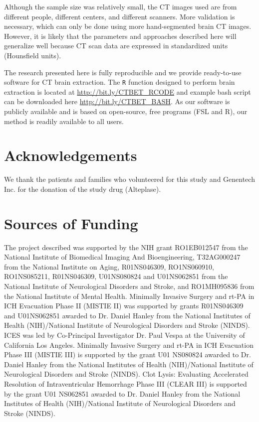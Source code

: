 \documentclass{elsarticle}\usepackage[]{graphicx}\usepackage[]{color}
\begin{document}
Although the sample size was relatively small, the CT images used are from different people, different centers, and different scanners.  More validation is necessary, which can only be done using more hand-segmented brain CT images. However, it is likely that the parameters and approaches described here will generalize well because CT scan data are expressed in standardized units (Hounsfield units).

The research presented here is fully reproducible and we provide ready-to-use software for CT brain extraction. The \texttt{R} function designed to perform brain extraction is located at
\url{http://bit.ly/CTBET_RCODE} and example bash script can be downloaded here \url{http://bit.ly/CTBET_BASH}.  As our software is publicly available and is based on open-source, free programs (FSL and R), our method is readily available to all users.

\section*{Acknowledgements}
We thank the patients and families who volunteered for this study and Genentech Inc. for the donation of the study drug (Alteplase).

\section*{Sources of Funding}
The project described was supported by the NIH grant RO1EB012547 from the National Institute of Biomedical Imaging And Bioengineering, T32AG000247 from the National Institute on Aging, R01NS046309, RO1NS060910, RO1NS085211, R01NS046309, U01NS080824 and U01NS062851 from the National Institute of Neurological Disorders and Stroke, and RO1MH095836 from the National Institute of Mental Health. Minimally Invasive Surgery and rt-PA in ICH Evacuation Phase II (MISTIE II) was supported by grants R01NS046309 and U01NS062851 awarded to Dr. Daniel Hanley from the National Institutes of Health (NIH)/National Institute of Neurological Disorders and Stroke (NINDS).  ICES was led by Co-Principal Investigator Dr. Paul Vespa at the University of California Los Angeles. Minimally Invasive Surgery and rt-PA in ICH Evacuation Phase III (MISTIE III) is supported by the grant U01 NS080824 awarded to Dr. Daniel Hanley from the National Institutes of Health (NIH)/National Institute of Neurological Disorders and Stroke (NINDS). Clot Lysis: Evaluating Accelerated Resolution of Intraventricular Hemorrhage Phase III (CLEAR III) is supported by the grant U01 NS062851 awarded to Dr. Daniel Hanley from the National Institutes of Health (NIH)/National Institute of Neurological Disorders and Stroke (NINDS). 
\end{document}
